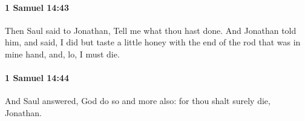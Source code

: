 		\paragraph{1 Samuel 14:43} %
			\label{1SAMUEL-14-43}

			Then Saul said to Jonathan, Tell me what thou hast done. And Jonathan told him, and said, I did but taste a little honey with the end of the rod that was in mine hand, and, lo, I must die.


		\paragraph{1 Samuel 14:44} %
			\label{1SAMUEL-14-44}

			And Saul answered, God do so and more also: for thou shalt surely die, Jonathan.


